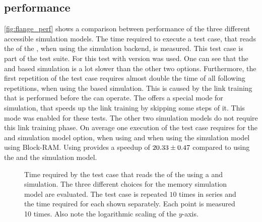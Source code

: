 \subsection{\flangedram{} performance}
\autoref{fig:flange_perf} shows a comparison between performance of the three different \AXI{} accessible \DRAM{} simulation models. The time required to execute a test case, that reads the \JTAGID{} of the \ASIC{}, when using the \hxcomm{} simulation backend, is measured. This test case is part of the \hxcomm{} test suite. For this test \xcelium{} with version \xceliumVer{} was used. One can see that the \XilinxMIG{} and \DDR{} based simulation is a lot slower than the other two options. Furthermore, the first repetition of the test case requires almost double the time of all following repetitions, when using the \XilinxMIG{} based simulation. This is caused by the link training that is performed before the \XilinxMIG{} can operate. The \XilinxMIG{} offers a special mode for simulation, that speeds up the link training by skipping some steps of it. This mode was enabled for these tests. The other two simulation models do not require this link training phase. On average one execution of the test case requires  for the \XilinxMIG{} and \DDR{} simulation model option,  when using \flangedram{} and  when using the simulation model using Block-RAM. Using \flangedram{} provides a speedup of $\num{20.331950+-0.47378}$ compared to using the \XilinxMIG{} and the \DDR{} simulation model.

\begin{figure}[htbp]
\caption{Time required by the \hxcomm{} test case that reads the \JTAGID{} of the \ASIC{} using a \FPGA{} and \ASIC{} simulation. The three different choices for the \AXI{} \DDR{} memory simulation model are evaluated. The \hxcomm{} test case is repeated $\num{10}$ times in series and the time required for each shown separately. Each point is measured 10 times. Also note the logarithmic scaling of the \(y\)-axis.}\label{fig:flange_perf}
\end{figure}

